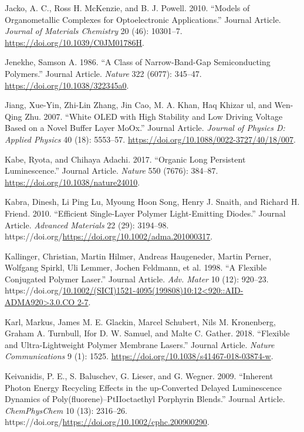 \documentclass[
  letterpaper,
  DIV=11,
  numbers=noendperiod,
  oneside]{scrreprt}
\newlength{\cslhangindent}
\newlength{\cslentryspacingunit} %
\newenvironment{CSLReferences}[2] %
 {%
  \setlength{\parindent}{0pt}
  \ifodd #1
  \let\oldpar\par
  \def\par{\hangindent=\cslhangindent\oldpar}
  \fi
  \setlength{\parskip}{#2\cslentryspacingunit}
 }%
 {}
\begin{document}
\begin{CSLReferences}{1}{0}
\leavevmode{}%
Jacko, A. C., Ross H. McKenzie, and B. J. Powell. 2010. {``Models of
Organometallic Complexes for Optoelectronic Applications.''} Journal
Article. \emph{Journal of Materials Chemistry} 20 (46): 10301--7.
\url{https://doi.org/10.1039/C0JM01786H}.

\leavevmode{}%
Jenekhe, Samson A. 1986. {``A Class of Narrow-Band-Gap Semiconducting
Polymers.''} Journal Article. \emph{Nature} 322 (6077): 345--47.
\url{https://doi.org/10.1038/322345a0}.

\leavevmode{}%
Jiang, Xue-Yin, Zhi-Lin Zhang, Jin Cao, M. A. Khan, Haq Khizar ul, and
Wen-Qing Zhu. 2007. {``White OLED with High Stability and Low Driving
Voltage Based on a Novel Buffer Layer MoOx.''} Journal Article.
\emph{Journal of Physics D: Applied Physics} 40 (18): 5553--57.
\url{https://doi.org/10.1088/0022-3727/40/18/007}.

\leavevmode{}%
Kabe, Ryota, and Chihaya Adachi. 2017. {``Organic Long Persistent
Luminescence.''} Journal Article. \emph{Nature} 550 (7676): 384--87.
\url{https://doi.org/10.1038/nature24010}.

\leavevmode{}%
Kabra, Dinesh, Li Ping Lu, Myoung Hoon Song, Henry J. Snaith, and
Richard H. Friend. 2010. {``Efficient Single-Layer Polymer
Light-Emitting Diodes.''} Journal Article. \emph{Advanced Materials} 22
(29): 3194--98.
https://doi.org/\url{https://doi.org/10.1002/adma.201000317}.

\leavevmode{}%
Kallinger, Christian, Martin Hilmer, Andreas Haugeneder, Martin Perner,
Wolfgang Spirkl, Uli Lemmer, Jochen Feldmann, et al. 1998. {``A Flexible
Conjugated Polymer Laser.''} Journal Article. \emph{Adv. Mater} 10 (12):
920--23.
https://doi.org/\href{https://doi.org/10.1002/(SICI)1521-4095(199808)10:12\%3C920::AID-ADMA920\%3E3.0.CO\%0A2-7}{10.1002/(SICI)1521-4095(199808)10:12\textless920::AID-ADMA920\textgreater3.0.CO
2-7}.

\leavevmode{}%
Karl, Markus, James M. E. Glackin, Marcel Schubert, Nils M. Kronenberg,
Graham A. Turnbull, Ifor D. W. Samuel, and Malte C. Gather. 2018.
{``Flexible and Ultra-Lightweight Polymer Membrane Lasers.''} Journal
Article. \emph{Nature Communications} 9 (1): 1525.
\url{https://doi.org/10.1038/s41467-018-03874-w}.

\leavevmode{}%
Keivanidis, P. E., S. Baluschev, G. Lieser, and G. Wegner. 2009.
{``Inherent Photon Energy Recycling Effects in the up-Converted Delayed
Luminescence Dynamics of Poly(fluorene)--PtIIoctaethyl Porphyrin
Blends.''} Journal Article. \emph{ChemPhysChem} 10 (13): 2316--26.
https://doi.org/\url{https://doi.org/10.1002/cphc.200900290}.


\end{CSLReferences}
\end{document}

